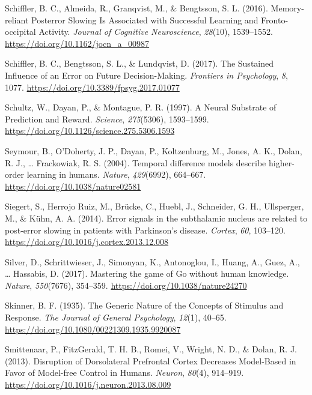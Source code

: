 \documentclass[12pt,openany]{book}
\theoremstyle{definition}
\theoremstyle{definition}
\theoremstyle{definition}
\theoremstyle{remark}
\begin{document}
\hypertarget{ref-Schiffler2016}{}
Schiffler, B. C., Almeida, R., Granqvist, M., \& Bengtsson, S. L.
(2016). Memory-reliant Posterror Slowing Is Associated with Successful
Learning and Fronto-occipital Activity. \emph{Journal of Cognitive
Neuroscience}, \emph{28}(10), 1539--1552.
\url{https://doi.org/10.1162/jocn_a_00987}

\hypertarget{ref-Schiffler2017}{}
Schiffler, B. C., Bengtsson, S. L., \& Lundqvist, D. (2017). The
Sustained Influence of an Error on Future Decision-Making.
\emph{Frontiers in Psychology}, \emph{8}, 1077.
\url{https://doi.org/10.3389/fpsyg.2017.01077}

\hypertarget{ref-Schultz1997}{}
Schultz, W., Dayan, P., \& Montague, P. R. (1997). A Neural Substrate of
Prediction and Reward. \emph{Science}, \emph{275}(5306), 1593--1599.
\url{https://doi.org/10.1126/science.275.5306.1593}

\hypertarget{ref-Seymour2004}{}
Seymour, B., O'Doherty, J. P., Dayan, P., Koltzenburg, M., Jones, A. K.,
Dolan, R. J., \ldots{} Frackowiak, R. S. (2004). Temporal difference
models describe higher-order learning in humans. \emph{Nature},
\emph{429}(6992), 664--667. \url{https://doi.org/10.1038/nature02581}

\hypertarget{ref-Siegert2014}{}
Siegert, S., Herrojo Ruiz, M., Brücke, C., Huebl, J., Schneider, G. H.,
Ullsperger, M., \& Kühn, A. A. (2014). Error signals in the subthalamic
nucleus are related to post-error slowing in patients with Parkinson's
disease. \emph{Cortex}, \emph{60}, 103--120.
\url{https://doi.org/10.1016/j.cortex.2013.12.008}

\hypertarget{ref-Silver2017}{}
Silver, D., Schrittwieser, J., Simonyan, K., Antonoglou, I., Huang, A.,
Guez, A., \ldots{} Hassabis, D. (2017). Mastering the game of Go without
human knowledge. \emph{Nature}, \emph{550}(7676), 354--359.
\url{https://doi.org/10.1038/nature24270}

\hypertarget{ref-Skinner1935}{}
Skinner, B. F. (1935). The Generic Nature of the Concepts of Stimulus
and Response. \emph{The Journal of General Psychology}, \emph{12}(1),
40--65. \url{https://doi.org/10.1080/00221309.1935.9920087}

\hypertarget{ref-Smittenaar2013}{}
Smittenaar, P., FitzGerald, T. H. B., Romei, V., Wright, N. D., \&
Dolan, R. J. (2013). Disruption of Dorsolateral Prefrontal Cortex
Decreases Model-Based in Favor of Model-free Control in Humans.
\emph{Neuron}, \emph{80}(4), 914--919.
\url{https://doi.org/10.1016/j.neuron.2013.08.009}
\end{document}
